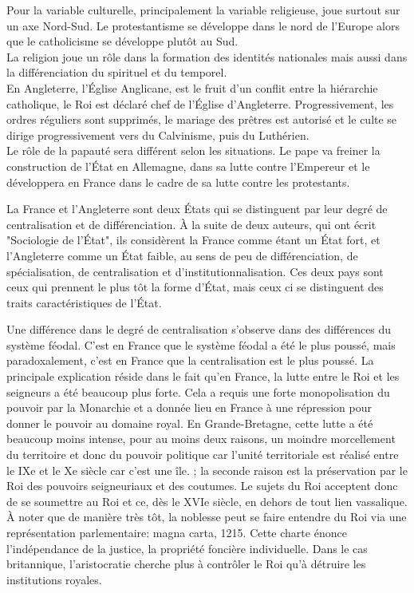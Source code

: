 \documentclass[10pt, a4paper, openany]{book}
\begin{document}
Pour la variable culturelle, principalement la variable religieuse, joue surtout sur un axe Nord-Sud. Le protestantisme se développe dans le nord de l'Europe alors que le catholicisme se développe plutôt au Sud. \\
La religion joue un rôle dans la formation des identités nationales mais aussi dans la différenciation du spirituel et du temporel. \\
En Angleterre, l'Église Anglicane, est le fruit d'un conflit entre la hiérarchie catholique, le Roi est déclaré chef de l'Église d'Angleterre. Progressivement, les ordres réguliers sont supprimés, le mariage des prêtres est autorisé et le culte se dirige progressivement vers du Calvinisme, puis du Luthérien. \\
Le rôle de la papauté sera différent selon les situations. Le pape va freiner la construction de l'État en Allemagne, dans sa lutte contre l'Empereur et le développera en France dans le cadre de sa lutte contre les protestants.


La France et l'Angleterre sont deux États qui se distinguent par leur degré de centralisation et de différenciation. À la suite de deux auteurs, qui ont écrit "Sociologie de l'État", ils considèrent la France comme étant un État fort, et l'Angleterre comme un État faible, au sens de peu de différenciation, de spécialisation, de centralisation et d'institutionnalisation. Ces deux pays sont ceux qui prennent le plus tôt la forme d'État, mais ceux ci se distinguent des traits caractéristiques de l'État.


Une différence dans le degré de centralisation s'observe dans des différences du système féodal. C'est en France que le système féodal a été le plus poussé, mais paradoxalement, c'est en France que la centralisation est le plus poussé. La principale explication réside dans le fait qu'en France, la lutte entre le Roi et les seigneurs a été beaucoup plus forte. Cela a requis une forte monopolisation du pouvoir par la Monarchie et a donnée lieu en France à une répression pour donner le pouvoir au domaine royal. En Grande-Bretagne, cette lutte a été beaucoup moins intense, pour au moins deux raisons, un moindre morcellement du territoire et donc du pouvoir politique car l'unité territoriale est réalisé entre le IXe et le Xe siècle car c'est une île. ; la seconde raison est la préservation par le Roi des pouvoirs seigneuriaux et des coutumes. Le sujets du Roi acceptent donc de se soumettre au Roi et ce, dès le XVIe siècle, en dehors de tout lien vassalique. À noter que de manière très tôt, la noblesse peut se faire entendre du Roi via une représentation parlementaire: magna carta, 1215. Cette charte énonce l'indépendance de la justice, la propriété foncière individuelle. Dans le cas britannique, l'aristocratie cherche plus à contrôler le Roi qu'à détruire les institutions royales.
\end{document}
